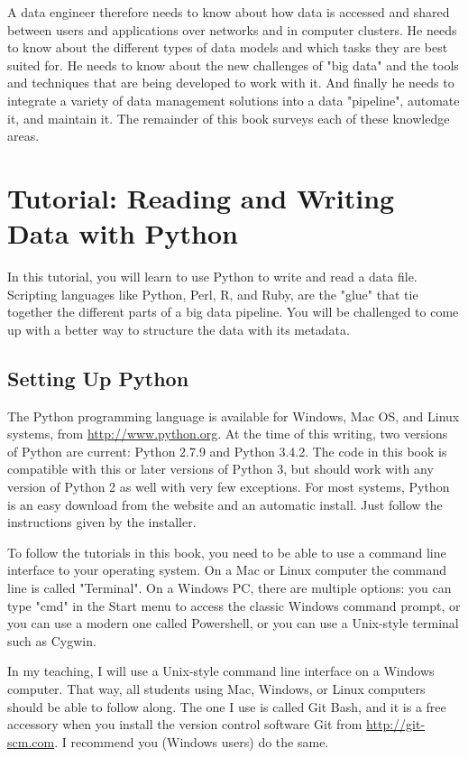 \documentclass[11pt]{book}
\begin{document}
A data engineer therefore needs to know about how data is accessed and shared between users and applications over networks and in computer clusters.  He needs to know about the different types of data models and which tasks they are best suited for.  He needs to know about the new challenges of "big data" and the tools and techniques that are being developed to work with it.  And finally he needs to integrate a variety of data management solutions into a data "pipeline", automate it, and maintain it.  The remainder of this book surveys each of these knowledge areas.

\section{Tutorial: Reading and Writing Data with Python}

In this tutorial, you will learn to use Python to write and read a data file.  Scripting languages like Python, Perl, R, and Ruby, are the "glue" that tie together the different parts of a big data pipeline.  You will be challenged to come up with a better way to structure the data with its metadata.

\subsection*{Setting Up Python}

The Python programming language is available for Windows, Mac OS, and Linux systems, from \url{http://www.python.org}.  At the time of this writing, two versions of Python are current: Python 2.7.9 and Python 3.4.2.  The code in this book is compatible with this or later versions of Python 3, but should work with any version of Python 2 as well with very few exceptions.  For most systems, Python is an easy download from the website and an automatic install.  Just follow the instructions given by the installer.

To follow the tutorials in this book, you need to be able to use a command line interface to your operating system.  On a Mac or Linux computer the command line is called "Terminal".  On a Windows PC, there are multiple options: you can type "cmd" in the Start menu to access the classic Windows command prompt, or you can use a modern one called Powershell, or you can use a Unix-style terminal such as Cygwin.

In my teaching, I will use a Unix-style command line interface on a Windows computer.  That way, all students using Mac, Windows, or Linux computers should be able to follow along.  The one I use is called Git Bash, and it is a free accessory when you install the version control software Git from \url{http://git-scm.com}.  I recommend you (Windows users) do the same.
\end{document}
